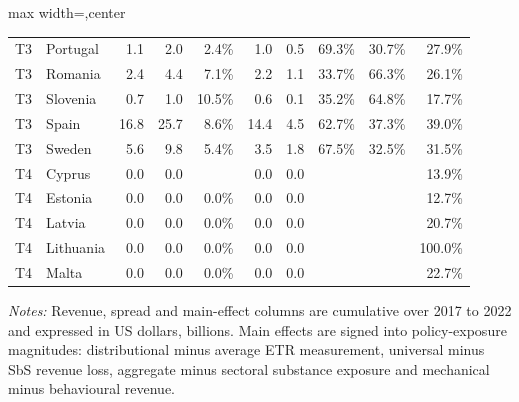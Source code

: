 \begin{table}[H]
\begin{adjustbox}{max width=\textwidth,center}
\begin{tabular}{@{}llrrrrrrrr@{}}
T3 & Portugal &  1.1 &  2.0 &   2.4\% &  1.0 &  0.5 &  69.3\% & 30.7\% &  27.9\% \\
T3 & Romania &  2.4 &  4.4 &   7.1\% &  2.2 &  1.1 &  33.7\% & 66.3\% &  26.1\% \\
T3 & Slovenia &  0.7 &  1.0 &  10.5\% &  0.6 &  0.1 &  35.2\% & 64.8\% &  17.7\% \\
T3 & Spain & 16.8 & 25.7 &   8.6\% & 14.4 &  4.5 &  62.7\% & 37.3\% &  39.0\% \\
T3 & Sweden &  5.6 &  9.8 &   5.4\% &  3.5 &  1.8 &  67.5\% & 32.5\% &  31.5\% \\
T4 & Cyprus &  0.0 &  0.0 &  &  0.0 &  0.0 &  &  &  13.9\% \\
T4 & Estonia &  0.0 &  0.0 &   0.0\% &  0.0 &  0.0 &  &  &  12.7\% \\
T4 & Latvia &  0.0 &  0.0 &   0.0\% &  0.0 &  0.0 &  &  &  20.7\% \\
T4 & Lithuania &  0.0 &  0.0 &   0.0\% &  0.0 &  0.0 &  &  & 100.0\% \\
T4 & Malta &  0.0 &  0.0 &   0.0\% &  0.0 &  0.0 &  &  &  22.7\% \\
\bottomrule
\end{tabular}
\end{adjustbox}

\vspace{0.5em}
\begin{minipage}{0.96\textwidth}
\footnotesize\raggedright \textit{Notes:} Revenue, spread and main-effect columns are cumulative over 2017 to 2022 and expressed in US dollars, billions. Main effects are signed into policy-exposure magnitudes: distributional minus average ETR measurement, universal minus SbS revenue loss, aggregate minus sectoral substance exposure and mechanical minus behavioural revenue.
\end{minipage}
\end{table}
